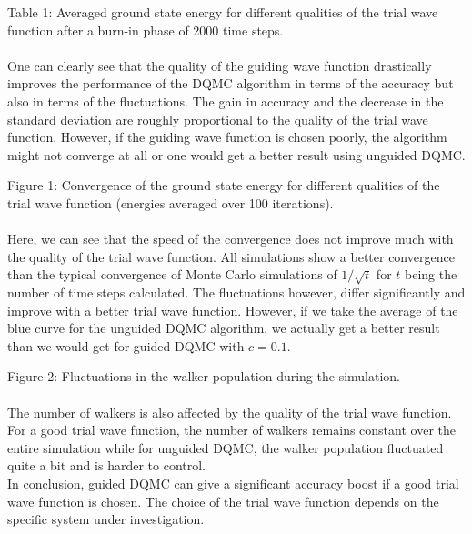 \documentclass [12pt]{report}
\begin{document}
Table 1: Averaged ground state energy for different qualities of the trial wave function after a burn-in phase of 2000 time steps.\\
\\
One can clearly see that the quality of the guiding wave function drastically improves the performance of the DQMC algorithm in terms of the accuracy but also in terms of the fluctuations. The gain in accuracy and the decrease in the standard deviation are roughly proportional to the quality of the trial wave function. However, if the guiding wave function is chosen poorly, the algorithm might not converge at all or one would get a better result using unguided DQMC.

\begin{center}
\end{center}
Figure 1: Convergence of the ground state energy for different qualities of the trial wave function (energies averaged over 100 iterations).\\
\\
Here, we can see that the speed of the convergence does not improve much with the quality of the trial wave function. All simulations show a better convergence than the typical convergence of Monte Carlo simulations of $1/\sqrt{t}$ for $t$ being the number of time steps calculated. The fluctuations however, differ significantly and improve with a better trial wave function. However, if we take the average of the blue curve for the unguided DQMC algorithm, we actually get a better result than we would get for guided DQMC with $c=0.1$.\\
\begin{center}
\end{center}
Figure 2: Fluctuations in the walker population during the simulation.\\
\\
The number of walkers is also affected by the quality of the trial wave function. For a good trial wave function, the number of walkers remains constant over the entire simulation while for unguided DQMC, the walker population fluctuated quite a bit and is harder to control.\\
In conclusion, guided DQMC can give a significant accuracy boost if a good trial wave function is chosen. The choice of the trial wave function depends on the specific system under investigation.
\end{document}
